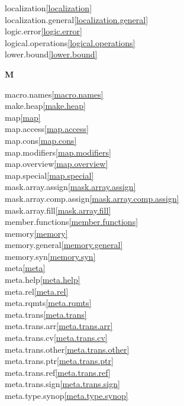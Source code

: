 \begin{multicols}{2}
localization\quad\ref{localization}\\
localization.general\quad\ref{localization.general}\\
logic.error\quad\ref{logic.error}\\
logical.operations\quad\ref{logical.operations}\\
lower.bound\quad\ref{lower.bound}\\
\par \textbf{M}\par
macro.names\quad\ref{macro.names}\\
make.heap\quad\ref{make.heap}\\
map\quad\ref{map}\\
map.access\quad\ref{map.access}\\
map.cons\quad\ref{map.cons}\\
map.modifiers\quad\ref{map.modifiers}\\
map.overview\quad\ref{map.overview}\\
map.special\quad\ref{map.special}\\
mask.array.assign\quad\ref{mask.array.assign}\\
mask.array.comp.assign\quad\ref{mask.array.comp.assign}\\
mask.array.fill\quad\ref{mask.array.fill}\\
member.functions\quad\ref{member.functions}\\
memory\quad\ref{memory}\\
memory.general\quad\ref{memory.general}\\
memory.syn\quad\ref{memory.syn}\\
meta\quad\ref{meta}\\
meta.help\quad\ref{meta.help}\\
meta.rel\quad\ref{meta.rel}\\
meta.rqmts\quad\ref{meta.rqmts}\\
meta.trans\quad\ref{meta.trans}\\
meta.trans.arr\quad\ref{meta.trans.arr}\\
meta.trans.cv\quad\ref{meta.trans.cv}\\
meta.trans.other\quad\ref{meta.trans.other}\\
meta.trans.ptr\quad\ref{meta.trans.ptr}\\
meta.trans.ref\quad\ref{meta.trans.ref}\\
meta.trans.sign\quad\ref{meta.trans.sign}\\
meta.type.synop\quad\ref{meta.type.synop}\\

\end{multicols}
